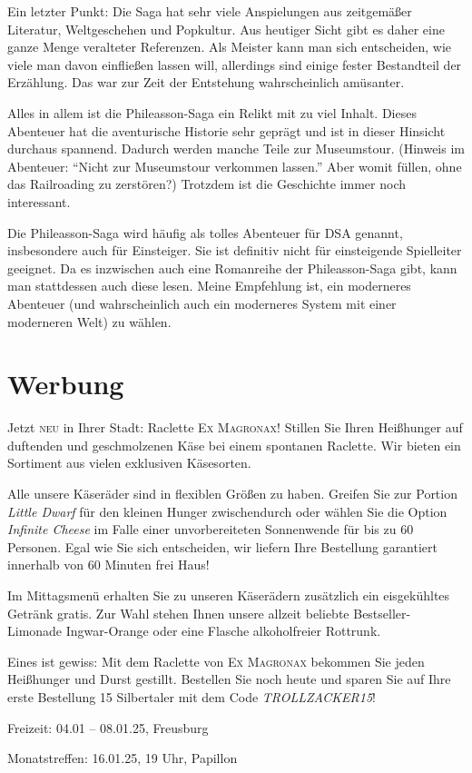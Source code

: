 \documentclass[final]{multiversum}
\begin{document}
Ein letzter Punkt: Die Saga hat sehr viele Anspielungen aus zeitgemäßer
Literatur, Weltgeschehen und Popkultur. Aus heutiger Sicht gibt es daher eine
ganze Menge veralteter Referenzen. Als Meister kann man sich entscheiden, wie
viele man davon einfließen lassen will, allerdings sind einige fester
Bestandteil der Erzählung. Das war zur Zeit der Entstehung wahrscheinlich
amüsanter.

Alles in allem ist die Phileasson-Saga ein Relikt mit zu viel Inhalt. Dieses
Abenteuer hat die aventurische Historie sehr geprägt und ist in dieser Hinsicht
durchaus spannend. Dadurch werden manche Teile zur Museumstour. (Hinweis im
Abenteuer: \enquote{Nicht zur Museumstour verkommen lassen.} Aber womit füllen,
ohne das Railroading zu zerstören?) Trotzdem ist die Geschichte immer noch
interessant.

Die Phileasson-Saga wird häufig als tolles Abenteuer für DSA genannt,
insbesondere auch für Einsteiger. Sie ist definitiv nicht für einsteigende
Spielleiter geeignet. Da es inzwischen auch eine Romanreihe der
Phileasson-Saga gibt, kann man stattdessen auch diese lesen. Meine Empfehlung
ist, ein moderneres Abenteuer (und wahrscheinlich auch ein moderneres System mit
einer moderneren Welt) zu wählen.

\section{Werbung}
Jetzt \textsc{neu} in Ihrer Stadt: Raclette \textsc{Ex Magronax}! Stillen Sie Ihren
Heißhunger auf duftenden und geschmolzenen Käse bei einem spontanen Raclette.
Wir bieten ein Sortiment aus vielen exklusiven Käsesorten.

Alle unsere Käseräder sind in flexiblen Größen zu haben. Greifen Sie zur Portion
\emph{Little Dwarf} für den kleinen Hunger zwischendurch oder wählen Sie die Option
\emph{Infinite Cheese} im Falle einer unvorbereiteten Sonnenwende für bis zu 60
Personen. Egal wie Sie sich entscheiden, wir liefern Ihre Bestellung garantiert
innerhalb von 60 Minuten frei Haus!

Im Mittagsmenü erhalten Sie zu unseren Käserädern zusätzlich ein eisgekühltes Getränk
gratis. Zur Wahl stehen Ihnen unsere allzeit beliebte Bestseller-Limonade
Ingwar-Orange oder eine Flasche alkoholfreier Rottrunk.

Eines ist gewiss: Mit dem Raclette von \textsc{Ex Magronax} bekommen Sie jeden
Heißhunger und Durst gestillt. Bestellen Sie noch heute und sparen Sie auf Ihre
erste Bestellung 15 Silbertaler mit dem Code \emph{TROLLZACKER15}!
\begin{termine}
  \item Freizeit: 04.01 -- 08.01.25, Freusburg
  \item Monatstreffen: 16.01.25, 19 Uhr, Papillon
\end{termine}
\impressum
\end{document}
